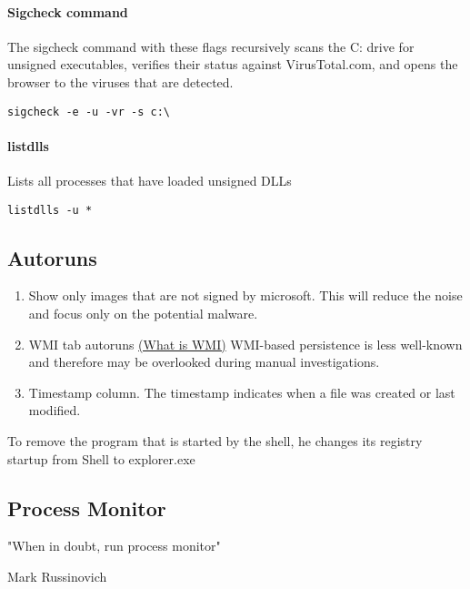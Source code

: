 \documentclass{article}
\begin{document}
\paragraph{Sigcheck command}
The sigcheck command with these flags recursively scans the C: 
drive for unsigned executables, verifies their status against VirusTotal.com,
 and opens the browser to the viruses that are detected.
\begin{lstlisting}[breaklines=true, columns=fullflexible]
        sigcheck -e -u -vr -s c:\       
\end{lstlisting}

\paragraph{listdlls}
Lists all processes that have loaded unsigned DLLs
\begin{lstlisting}[breaklines=true, columns=fullflexible]
        listdlls -u *       
\end{lstlisting}

\subsection{Autoruns}

\begin{enumerate}
        \item Show only images that are not signed by microsoft. This will reduce the noise and focus only on the potential malware.
        \item WMI tab autoruns \href{https://medium.com/threatpunter/detecting-removing-wmi-persistence-60ccbb7dff96}{(What is WMI)} WMI-based persistence is less well-known and therefore may be overlooked during manual investigations. 
        \item Timestamp column. The timestamp indicates when a file was created or last modified.
\end{enumerate}

To remove the program that is started by the shell, he changes its registry startup from 
Shell to explorer.exe

\subsection{Process Monitor}
\epigraph{"When in doubt, run process monitor"}{Mark Russinovich}

\end{document}
